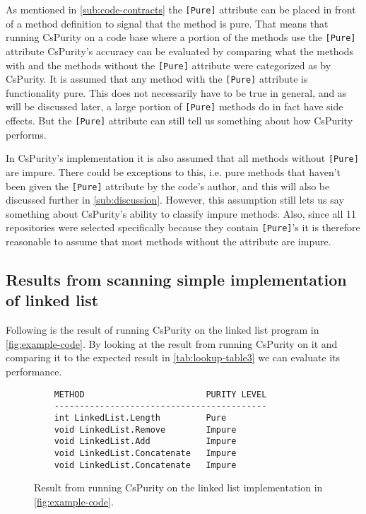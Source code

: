 \documentclass[a4paper,12pt]{article}
\begin{document}
As mentioned in \autoref{sub:code-contracts} the \texttt{[Pure]} attribute can be placed in front of a method definition to signal that the method is pure. That means that running CsPurity on a code base where a portion of the methods use the \texttt{[Pure]} attribute CsPurity's accuracy can be evaluated by comparing what the methods with and the methods without the \texttt{[Pure]} attribute were categorized as by CsPurity. It is assumed that any method with the \texttt{[Pure]} attribute is functionality pure. This does not necessarily have to be true in general, and as will be discussed later, a large portion of \texttt{[Pure]} methods do in fact have side effects. But the \texttt{[Pure]} attribute can still tell us something about how CsPurity performs.

In CsPurity's implementation it is also assumed that all methods without \texttt{[Pure]} are impure. There could be exceptions to this, i.e. pure methods that haven't been given the \texttt{[Pure]} attribute by the code's author, and this will also be discussed further in \autoref{sub:discussion}. However, this assumption still lets us say something about CsPurity's ability to classify impure methods. Also, since all 11 repositories were selected specifically because they contain \texttt{[Pure]}'s it is therefore reasonable to assume that most methods without the attribute are impure.

\subsection{Results from scanning simple implementation of linked list} \label{sub:results-from-scanning-the-example-list}

Following is the result of running CsPurity on the linked list program in \autoref{fig:example-code}. By looking at the result from running CsPurity on it and comparing it to the expected result in \autoref{tab:lookup-table3} we can evaluate its performance.

\begin{figure}[htpb]
  \centering
  \begin{minipage}{\linewidth} %
    \begin{lstlisting}
    METHOD                        PURITY LEVEL
    ------------------------------------------
    int LinkedList.Length         Pure
    void LinkedList.Remove        Impure
    void LinkedList.Add           Impure
    void LinkedList.Concatenate   Impure
    void LinkedList.Concatenate   Impure
    \end{lstlisting}
  \end{minipage}
  \caption{Result from running CsPurity on the linked list implementation in \autoref{fig:example-code}.}
  \label{fig:example-result}
\end{figure}
\end{document}
